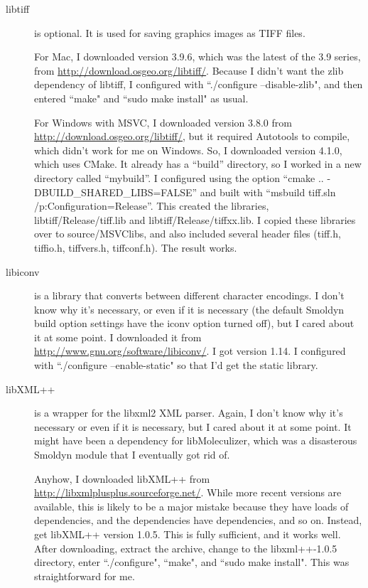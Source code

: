 \documentclass {scrbook}
\begin{document}
\begin{description}
\item[libtiff] is optional. It is used for saving graphics images as TIFF files.

For Mac, I downloaded version 3.9.6, which was the latest of the 3.9 series, from \url{http://download.osgeo.org/libtiff/}. Because I didn't want the zlib dependency of libtiff, I configured with ``./configure --disable-zlib", and then entered ``make" and ``sudo make install" as usual.

For Windows with MSVC, I downloaded version 3.8.0 from \url{http://download.osgeo.org/libtiff/}, but it required Autotools to compile, which didn't work for me on Windows. So, I downloaded version 4.1.0, which uses CMake. It already has a ``build'' directory, so I worked in a new directory called ``mybuild''. I configured using the option ``cmake .. -DBUILD\_SHARED\_LIBS=FALSE'' and built with ``msbuild tiff.sln /p:Configuration=Release''. This created the libraries, libtiff/Release/tiff.lib and libtiff/Release/tiffxx.lib. I copied these libraries over to source/MSVClibs, and also included several header files (tiff.h, tiffio.h, tiffvers.h, tiffconf.h). The result works.

\item[libiconv] is a library that converts between different character encodings. I don't know why it's necessary, or even if it is necessary (the default Smoldyn build option settings have the iconv option turned off), but I cared about it at some point. I downloaded it from \url{http://www.gnu.org/software/libiconv/}. I got version 1.14. I configured with ``./configure --enable-static" so that I'd get the static library.

\item[libXML++] is a wrapper for the libxml2 XML parser. Again, I don't know why it's necessary or even if it is necessary, but I cared about it at some point. It might have been a dependency for libMoleculizer, which was a disasterous Smoldyn module that I eventually got rid of.

Anyhow, I downloaded libXML++ from \url{http://libxmlplusplus.sourceforge.net/}. While more recent versions are available, this is likely to be a major mistake because they have loads of dependencies, and the dependencies have dependencies, and so on. Instead, get libXML++ version 1.0.5. This is fully sufficient, and it works well. After downloading, extract the archive, change to the libxml++-1.0.5 directory, enter ``./configure", ``make", and ``sudo make install". This was straightforward for me.


\end{description}
\end{document}
